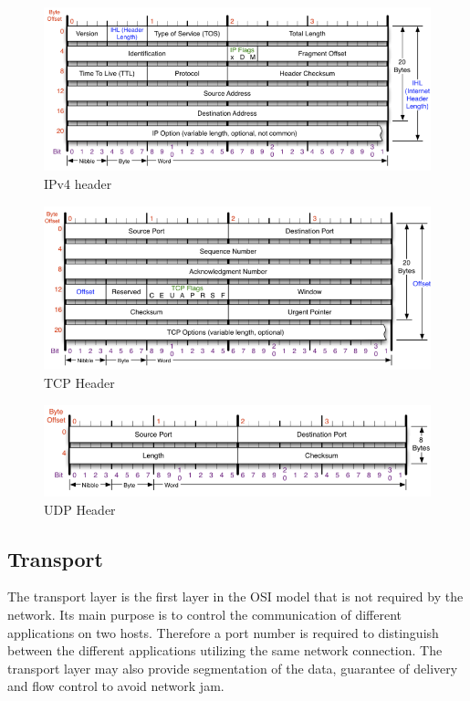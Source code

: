 \begin{figure}[tb!]
    \centering
    \includegraphics[width=\textwidth]{images/theory/ip.png}
    \caption{IPv4 header \cite{ip}}
    \label{fig:ip}
\end{figure}
\begin{figure}[tb!]
    \centering
    \includegraphics[width=\textwidth]{images/theory/tcp.png}
    \caption{TCP Header \cite{tcpudp}}
    \label{fig:tcp}
\end{figure}
\begin{figure}[tb!]
    \centering
    \includegraphics[width=\textwidth]{images/theory/udp.png}
    \caption{UDP Header \cite{tcpudp}}
    \label{fig:udp}
\end{figure}


\subsection{Transport} 
The transport layer is the first layer in the OSI model that is not required by
the network. Its main purpose is to control the communication of different
applications on two hosts. Therefore a port number is required to distinguish
between the different applications utilizing the same network connection. The
transport layer may also provide segmentation of the data, guarantee of delivery and flow control to avoid network jam.
\\

